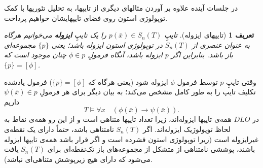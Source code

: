 \documentclass[12pt,a4paper]{article}
\theoremstyle{colorhead}
\newtheorem{defn}[thm]{تعریف}
\begin{document}
در جلسات آینده علاوه بر آوردن مثالهای دیگری از تایپها، به تحلیل تئوریها 
با کمک توپولوژی استون روی فضای تایپهایشان خواهیم پرداخت. 
\begin{defn}[تایپهای ایزوله]
تایپِ
$p(\bar{x})\in S_n(T)$
را یک تایپِ
\textbf{ایزوله}
می‌خوانیم هرگاه به عنوان عنصری از
$S_n(T)$
در توپولوژی استون ایزوله باشد؛ یعنی
$\{p\}$
مجموعه‌ای باز باشد. بنابراین اگر
$p$
ایزوله باشد، آنگاه فرمولِ
$\phi\in p$
چنان موجود است که 
$\{p\}=[\phi]$.
\end{defn}
وقتی تایپِ
$p$
توسط فرمول
$\phi$
ایزوله شود (یعنی هرگاه که 
$\{p\}=[\phi]$)
فرمول یادشده تکلیف تایپ را به طور کامل مشخص می‌کند؛ به بیان دیگر برای هر فرمولِ
$\psi(\bar{x})\in p$
داریم
\[
T\models \forall x\quad (\phi(\bar{x})\to \psi(\bar{x})).
\]
در
$DLO$
همه‌ی تاپیها ایزوله‌اند، زیرا تعداد تایپها متناهی است و از این رو همه‌ی نقاط به لحاظ توپولوژیک ایزوله‌اند. 
اگر
$S_n(T)$
نامتناهی باشد، حتماً دارای یک نقطه‌ی غیرایزوله است (زیرا توپولوژی استون فشرده است و اگر قرار باشد همه‌ی تایپها ایزوله باشند، پوششی نامتناهی از متشکل از 
مجموعه‌های باز تک‌نقطه‌ای برای
$S_n(T)$
یافت می‌شود که دارای هیچ‌ زیرپوشش متناهی‌ای نباشد).
\end{document}
